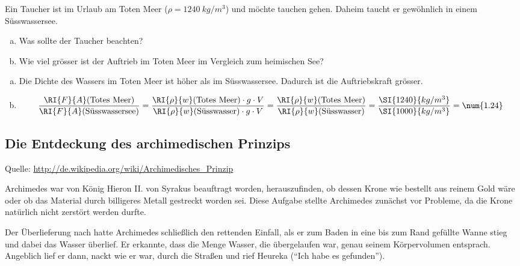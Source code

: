 \begin{aufgabe}
	Ein Taucher ist im Urlaub am Toten Meer ($\rho=\SI{1240}{kg/m^3}$) und möchte tauchen gehen. 
	Daheim taucht er gewöhnlich in einem Süsswassersee.
	\begin{enumerate} [a)]
		\item Was sollte der Taucher beachten?
		\item Wie viel grösser ist der Auftrieb im Toten Meer im Vergleich zum heimischen See?
	\end{enumerate}
	\begin{loesung}
		\begin{enumerate} [a)]
		\item Die Dichte des Wassers im Toten Meer ist höher als im Süsswassersee.
			Dadurch ist die Auftriebskraft grösser.
		\item
			\begin{eqnarray*}
				\frac{\RI{F}{A}(\textrm{Totes Meer})}{\RI{F}{A}(\textrm{Süsswassersee})}=\frac{\RI{\rho}{w}(\textrm{Totes Meer})\cdot g\cdot V}{\RI{\rho}{w}(\textrm{Süsswasser})\cdot g\cdot V}=\frac{\RI{\rho}{w}(\textrm{Totes Meer})}{\RI{\rho}{w}(\textrm{Süsswasser})}=\frac{\SI{1240}{kg/m^3}}{\SI{1000}{kg/m^3}}=\num{1.24}
			\end{eqnarray*}
		\end{enumerate}
	\end{loesung}

\end{aufgabe}


\newpage

\subsection*{Die Entdeckung des archimedischen Prinzips}
Quelle: \url{http://de.wikipedia.org/wiki/Archimedisches_Prinzip}

Archimedes war von König Hieron II. von Syrakus beauftragt worden, herauszufinden, 
ob dessen Krone wie bestellt aus reinem Gold wäre oder ob das Material durch billigeres Metall gestreckt worden sei. 
Diese Aufgabe stellte Archimedes zunächst vor Probleme, da die Krone natürlich nicht zerstört werden durfte.

Der Überlieferung nach hatte Archimedes schließlich den rettenden Einfall, 
als er zum Baden in eine bis zum Rand gefüllte Wanne stieg und dabei das Wasser überlief. 
Er erkannte, dass die Menge Wasser, die übergelaufen war, genau seinem Körpervolumen entsprach. 
Angeblich lief er dann, nackt wie er war, durch die Straßen und rief Heureka (``Ich habe es gefunden'').

